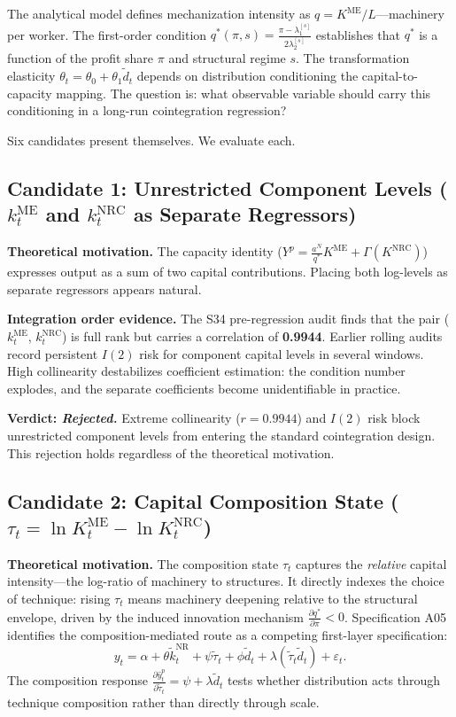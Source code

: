 \documentclass[11pt,a4paper]{article}
\begin{document}
The analytical model defines mechanization intensity as $q = K^{\text{ME}}/L$---machinery per worker. The first-order condition $q^*(\pi, s) = \frac{\pi - \lambda_1^{[s]}}{2\lambda_2^{[s]}}$ establishes that $q^*$ is a function of the profit share $\pi$ and structural regime $s$. The transformation elasticity $\theta_t = \theta_0 + \theta_1 \tilde{d}_t$ depends on distribution conditioning the capital-to-capacity mapping. The question is: what observable variable should carry this conditioning in a long-run cointegration regression?

Six candidates present themselves. We evaluate each.

\subsection{Candidate 1: Unrestricted Component Levels ($k^{\text{ME}}_t$ and $k^{\text{NRC}}_t$ as Separate Regressors)}

\textbf{Theoretical motivation.} The capacity identity ($Y^p = \frac{a^N}{q^*} K^{\text{ME}} + \Gamma(K^{\text{NRC}})$) expresses output as a sum of two capital contributions. Placing both log-levels as separate regressors appears natural.

\textbf{Integration order evidence.} The S34 pre-regression audit finds that the pair ($k^{\text{ME}}_t$, $k^{\text{NRC}}_t$) is full rank but carries a correlation of \textbf{0.9944}. Earlier rolling audits record persistent $I(2)$ risk for component capital levels in several windows. High collinearity destabilizes coefficient estimation: the condition number explodes, and the separate coefficients become unidentifiable in practice.

\textbf{Verdict: \textit{Rejected.}} Extreme collinearity ($r = 0.9944$) and $I(2)$ risk block unrestricted component levels from entering the standard cointegration design. This rejection holds regardless of the theoretical motivation.

\subsection{Candidate 2: Capital Composition State ($\tau_t = \ln K^{\text{ME}}_t - \ln K^{\text{NRC}}_t$)}

\textbf{Theoretical motivation.} The composition state $\tau_t$ captures the \textit{relative} capital intensity---the log-ratio of machinery to structures. It directly indexes the choice of technique: rising $\tau_t$ means machinery deepening relative to the structural envelope, driven by the induced innovation mechanism $\frac{\partial q^*}{\partial \pi} < 0$. Specification A05 identifies the composition-mediated route as a competing first-layer specification:
\begin{equation*}
y_t = \alpha + \theta \tilde{k}_t^{\text{NR}} + \psi \tilde{\tau}_t + \phi \tilde{d}_t + \lambda(\tilde{\tau}_t \tilde{d}_t) + \varepsilon_t. \tag{$D_8$}
\end{equation*}
The composition response $\frac{\partial \hat{y}_t^p}{\partial \tilde{\tau}_t} = \psi + \lambda \tilde{d}_t$ tests whether distribution acts through technique composition rather than directly through scale.
\end{document}
